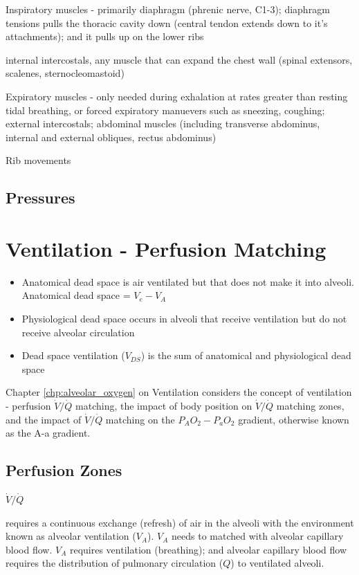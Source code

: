 Inspiratory muscles - primarily diaphragm (phrenic nerve, C1-3); diaphragm tensions pulls the thoracic cavity down (central tendon extends down to it's attachments); and it pulls up on the lower ribs


internal intercostals, any muscle that can expand the chest wall (spinal extensors, scalenes, sternocleomastoid)

Expiratory muscles - only needed during exhalation at rates greater than resting tidal breathing, or forced expiratory manuevers such as sneezing, coughing; external intercostals; abdominal muscles (including transverse abdominus, internal and external obliques, rectus abdominus)

Rib movements


\subsection{Pressures}





\section{Ventilation - Perfusion Matching}

\begin{itemize}
       \item Anatomical dead space is air ventilated but that does not make it into alveoli. Anatomical dead space = $V_e - V_A$
    \item Physiological dead space occurs in alveoli that receive ventilation but do not receive alveolar circulation
    \item Dead space ventilation ($V_{DS}$) is the sum of anatomical and physiological dead space
\end{itemize}


Chapter \ref{chp:alveolar_oxygen} on Ventilation considers the concept of ventilation - perfusion $\dot{V}/\dot{Q}$ matching, the impact of body position on $\dot{V}/\dot{Q}$ matching zones, and the impact of $\dot{V}/\dot{Q}$ matching on the $P_AO_2-P_aO_2$ gradient, otherwise known as the A-a gradient.
\subsection{Perfusion Zones}
$\dot{V}/\dot{Q}$

requires a continuous exchange (refresh) of air in the alveoli with the environment known as alveolar ventilation ($V_A$). $V_A$ needs to matched with alveolar capillary blood flow. $V_A$ requires ventilation (breathing); and alveolar capillary blood flow requires the distribution of pulmonary circulation ($Q$) to ventilated alveoli. 


